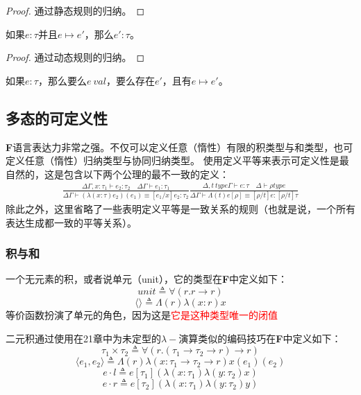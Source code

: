 \begin{proof}
  通过静态规则的归纳。
\end{proof}

\begin{theorem}[保留性]
  如果$e:\tau$并且$e \longmapsto e'$，那么$e':\tau$。
\end{theorem}

\begin{proof}
  通过动态规则的归纳。
\end{proof}

\begin{theorem}[可归纳性]
  如果$e:\tau$，那么要么$e \ val$，要么存在$e'$，且有$e \longmapsto e'$。
\end{theorem}

\subsection{多态的可定义性}
\textbf{F}语言表达力非常之强。不仅可以定义任意（惰性）有限的积类型与和类型，也可定义任意（惰性）归纳类型与协同归纳类型。
使用定义平等来表示可定义性是最自然的，这是包含以下两个公理的最不一致的定义：
\begin{gather}
  \frac{\Delta \Gamma, x:\tau_1 \vdash e_2:\tau_2 \quad \Delta \Gamma \vdash e_1:\tau_1}{\Delta \Gamma \vdash (\lambda (x:\tau)e_2)(e_1) \equiv [e_1/x]e_2: \tau_2}
  \frac{\Delta, t \ type \Gamma \vdash e:\tau \quad \Delta \vdash \rho type}{\Delta \Gamma \vdash \Lambda (t) e[\rho] \equiv [\rho/t]e:[\rho/t]\tau}
\end{gather}
除此之外，这里省略了一些表明定义平等是一致关系的规则（也就是说，一个所有表达生成都一致的平等关系）。

\subsubsection{积与和}
一个无元素的积，或者说单元（unit），它的类型在\textbf{F}中定义如下：
$$unit \triangleq \forall (r.r \to r)$$
$$\langle \rangle \triangleq \Lambda (r) \lambda (x:r) x$$
等价函数扮演了单元的角色，因为这是\textcolor{red}{它是这种类型唯一的闭值}

二元积通过使用在21章中为未定型的$\lambda-演算$类似的编码技巧在\textbf{F}中定义如下：
$$\tau_1 \times \tau_2 \triangleq \forall (r.(\tau_1 \to \tau_2 \to r)\to r)$$
$$\langle e_1, e_2 \rangle \triangleq \Lambda (r) \lambda (x:\tau_1 \to \tau_2 \to r)x(e_1)(e_2)$$
$$e \cdot l \triangleq e[\tau_1](\lambda (x:\tau_1)\lambda (y:\tau_2)x)$$
$$e \cdot r \triangleq e[\tau_2](\lambda (x:\tau_1)\lambda (y:\tau_2)y)$$

